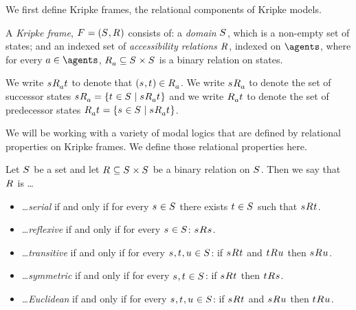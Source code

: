 We first define Kripke frames, the relational components of Kripke models.

\begin{definition}
A {\em Kripke frame}, $\kFrameAndTuple$ consists of:
a {\em domain} $\kStates$, which is a non-empty set of states; and
an indexed set of {\em accessibility relations} $\kAccessibilityRel$, indexed on $\agents$, where for every $\agentA \in \agents$, $\kAccessibilityA \subseteq \kStates \times \kStates$ is a binary relation on states.
\end{definition}

We write $\kStateS \kAccessibilityA \kStateT$ to denote that $(\kStateS, \kStateT) \in \kAccessibilityA$.
We write $\kSuccessorsA{\kStateS}$ to denote the set of successor states $\kSuccessorsA{\kStateS} = \{\kStateT \in \kStates \mid \kStateS \kAccessibilityA \kStateT\}$ and
we write $\kPredecessorsA{\kStateT}$ to denote the set of predecessor states $\kPredecessorsA{\kStateT} = \{\kStateS \in \kStates \mid \kStateS \kAccessibilityA \kStateT\}$.

We will be working with a variety of modal logics that are defined by relational properties on Kripke frames.
We define those relational properties here.

\begin{definition}
Let $\kStates$ be a set and let $\kAccessibilityRel \subseteq \kStates \times \kStates$ be a binary relation on $\kStates$. 
Then we say that $\kAccessibilityRel$ is \ldots
\begin{itemize}
    \item \ldots {\em serial} if and only if for every $\kStateS \in \kStates$ there exists $\kStateT \in \kStates$ such that $\kStateS \kAccessibility{} \kStateT$.
    \item \ldots {\em reflexive} if and only if for every $\kStateS \in \kStates$: $\kStateS \kAccessibility{} \kStateS$.
    \item \ldots {\em transitive} if and only if for every $\kStateS, \kStateT, \kStateU \in \kStates$: if $\kStateS \kAccessibility{} \kStateT$ and $\kStateT \kAccessibility{} \kStateU$ then $\kStateS \kAccessibility{} \kStateU$.
    \item \ldots {\em symmetric} if and only if for every $\kStateS, \kStateT \in \kStates$: if $\kStateS \kAccessibility{} \kStateT$ then $\kStateT \kAccessibility{} \kStateS$.
    \item \ldots {\em Euclidean} if and only if for every $\kStateS, \kStateT, \kStateU \in \kStates$: if $\kStateS \kAccessibility{} \kStateT$ and $\kStateS \kAccessibility{} \kStateU$ then $\kStateT \kAccessibility{} \kStateU$.
\end{itemize}
\end{definition}


